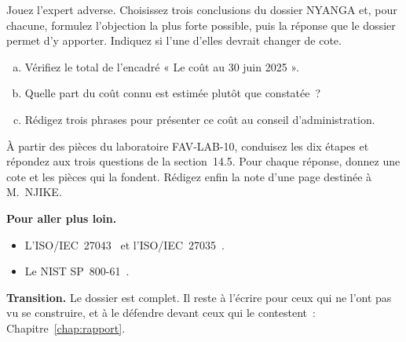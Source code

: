 \begin{boxexo}[title={\ding{45}\quad Exercice~14.2. Relecture contradictoire \niveaumoyen}]
Jouez l'expert adverse. Choisissez trois conclusions du dossier NYANGA et,
pour chacune, formulez l'objection la plus forte possible, puis la réponse
que le dossier permet d'y apporter. Indiquez si l'une d'elles devrait
changer de cote.
\end{boxexo}

\begin{boxexo}[title={\ding{45}\quad Exercice~14.3. Le coût \niveaumoyen}]
\begin{enumerate}[(a)]
    \item Vérifiez le total de l'encadré « Le coût au 30 juin 2025 ».
    \item Quelle part du coût connu est estimée plutôt que constatée~?
    \item Rédigez trois phrases pour présenter ce coût au conseil
          d'administration.
\end{enumerate}
\end{boxexo}

\begin{boxexo}[title={\ding{45}\quad Exercice~14.4. SOLITRANS, février 2026 \niveauexpert}]
À partir des pièces du laboratoire FAV-LAB-10, conduisez les dix étapes et
répondez aux trois questions de la section~14.5. Pour chaque réponse,
donnez une cote et les pièces qui la fondent. Rédigez enfin la note d'une
page destinée à M.~NJIKE.
\end{boxexo}

\bigskip

\begin{boxinfo}
\textbf{Pour aller plus loin.}
\begin{itemize}
    \item L'ISO/IEC~27043~\cite{iso27043_2015} et l'ISO/IEC~27035~\cite{iso27035}.
    \item Le NIST SP~800-61~\cite{nist80061r2}.
\end{itemize}
\end{boxinfo}

\begin{boxinfo}
\textbf{Transition.} Le dossier est complet. Il reste à l'écrire pour ceux
qui ne l'ont pas vu se construire, et à le défendre devant ceux qui le
contestent~: Chapitre~\ref{chap:rapport}.
\end{boxinfo}
